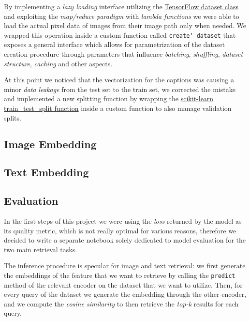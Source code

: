 \documentclass[12pt, a4paper]{article}
\begin{document}
By implementing a \textit{lazy loading} interface utilizing the \href{https://www.tensorflow.org/api_docs/python/tf/data/Dataset}{TensorFlow dataset class} and exploiting the \textit{map/reduce paradigm} with \textit{lambda functions} we were able to load the actual pixel data of images from their image path only when needed.
We wrapped this operation inside a custom function called \texttt{create\char`_dataset} that exposes a general interface which allows for parametrization of the dataset creation procedure through parameters that influence \textit{batching}, \textit{shuffling}, \textit{dataset structure}, \textit{caching} and other aspects.

At this point we noticed that the vectorization for the captions was causing a minor \textit{data leakage} from the test set to the train set, we corrected the mistake and implemented a new splitting function by wrapping the \href{https://scikit-learn.org/stable/modules/generated/sklearn.model_selection.train_test_split.html}{scikit-learn train\_test\_split function} inside a custom function to also manage validation splits.

\subsection{Image Embedding}
\blindtext[1]

\subsection{Text Embedding}
\blindtext[1]

\subsection{Evaluation}
In the first steps of this project we were using the \textit{loss} returned by the model as its quality metric, which is not really optimal for various reasons, therefore we decided to write a separate notebook solely dedicated to model evaluation for the two main retrieval tasks.

The inference procedure is specular for image and text retrieval: we first generate the embeddings of the feature that we want to retrieve by calling the \texttt{predict} method of the relevant encoder on the dataset that we want to utilize.
Then, for every query of the dataset we generate the embedding through the other encoder, and we compute the \textit{cosine similarity} to then retrieve the \textit{top-k} results for each query.
\end{document}
